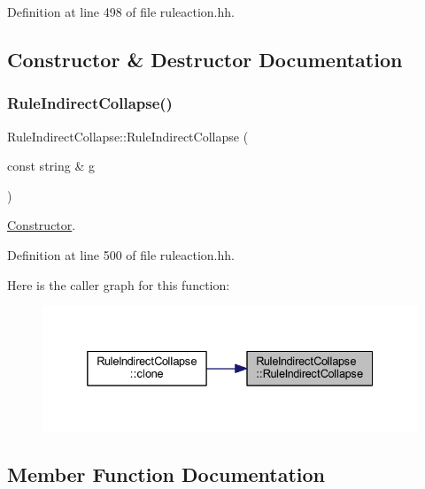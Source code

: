 Definition at line 498 of file ruleaction.\+hh.



\subsection{Constructor \& Destructor Documentation}
\mbox{\label{class_rule_indirect_collapse_a652d7b58ef0155951761c5de78545f58}} 
\subsubsection{\texorpdfstring{RuleIndirectCollapse()}{RuleIndirectCollapse()}}
{\footnotesize\ttfamily Rule\+Indirect\+Collapse\+::\+Rule\+Indirect\+Collapse (\begin{DoxyParamCaption}\item[{const string \&}]{g }\end{DoxyParamCaption})\hspace{0.3cm}{\ttfamily [inline]}}



\mbox{\hyperlink{class_constructor}{Constructor}}. 



Definition at line 500 of file ruleaction.\+hh.

Here is the caller graph for this function\+:
\nopagebreak
\begin{figure}[H]
\begin{center}
\leavevmode
\includegraphics[width=332pt]{class_rule_indirect_collapse_a652d7b58ef0155951761c5de78545f58_icgraph}
\end{center}
\end{figure}


\subsection{Member Function Documentation}
\mbox{\label{class_rule_indirect_collapse_a0d4041209c44deabc2baa829c022d642}} 
